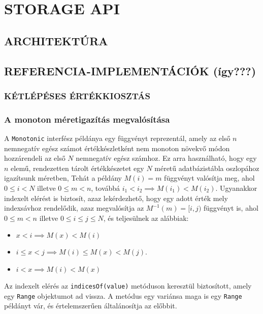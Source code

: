 \documentclass[
    parspace,
    noindent,
    nohyp,
]{elteiktdk}[2023/04/10]
\begin{document}
\chapter{STORAGE API}

\section{ARCHITEKTÚRA}

\section{REFERENCIA-IMPLEMENTÁCIÓK (így???)}

\subsection{KÉTLÉPÉSES ÉRTÉKKIOSZTÁS}

\subsection{A monoton méretigazítás megvalósítása}

A \texttt{Monotonic} interfész példánya egy függvényt reprezentál,
amely az első $n$ nemnegatív egész számot értékkészletként nem monoton növekvő módon hozzárendeli az első $N$ nemnegatív egész számhoz.
Ez arra használható, hogy egy $n$ elemű, rendezetten tárolt értékkészetet egy $N$ méretű adatbázistábla oszlopához igazítsunk méretben,
Tehát a példány $M(i) = m$ függvényt valósítja meg, ahol $0 \leq i < N$ illetve $0 \leq m < n$, továbbá $i_1 < i_2 \implies M(i_1) < M(i_2)$.
Ugyanakkor indexelt elérést is biztosít, azaz lekérdezhető, hogy egy adott érték mely indexsávhoz rendelődik,
azaz megvalósítja az $M^{-1}(m) = [i, j)$ függvényt is, ahol $0 \leq m < n$ illetve $0 \leq i \leq j \leq N$, és teljesülnek az alábbiak:

\begin{itemize}
\item $x < i \implies M(x) < M(i)$
\item $i \leq x < j \implies M(i) \leq M(x) < M(j)$.
\item $i < x \implies M(i) < M(x)$
\end{itemize}

Az indexelt elérés az \texttt{indicesOf(value)} metóduson keresztül biztosított, amely egy \texttt{Range} objektumot ad vissza.
A metódus egy variánsa maga is egy \texttt{Range} példányt vár, és értelemszerűen általánosítja az előbbit.
\end{document}
